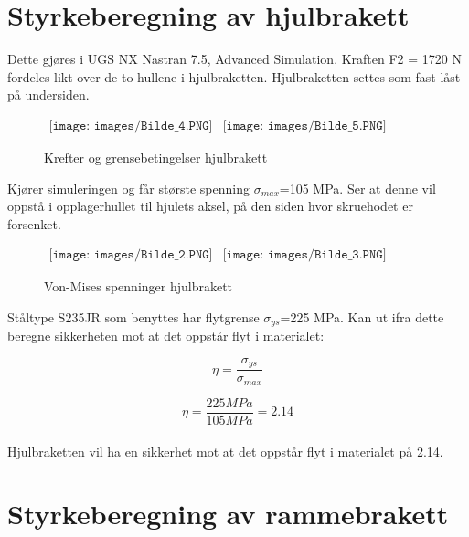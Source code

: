 \section{Styrkeberegning av hjulbrakett}
Dette gjøres i UGS NX Nastran 7.5, Advanced Simulation. Kraften F2 = 1720 N fordeles likt over de to hullene i hjulbraketten. Hjulbraketten settes som fast låst på undersiden.

\begin{figure}[h]
\begin{center}$
\begin{array}{ccc}
\texttt{[image: images/Bilde\_4.PNG]} &
\texttt{[image: images/Bilde\_5.PNG]} &  
\end{array}$
\end{center}
\caption{Krefter og grensebetingelser hjulbrakett}
\end{figure}

Kjører simuleringen og får største spenning $\sigma_{max}$=105 MPa. Ser at denne vil oppstå i opplagerhullet til hjulets aksel, på den siden hvor skruehodet er forsenket.

\begin{figure}[h]
\begin{center}$
\begin{array}{ccc}
\texttt{[image: images/Bilde\_2.PNG]} &
\texttt{[image: images/Bilde\_3.PNG]} &  
\end{array}$
\end{center}
\caption{Von-Mises spenninger hjulbrakett}
\end{figure}

Ståltype S235JR som benyttes har flytgrense $\sigma_{ys}$=225 MPa. Kan ut ifra dette beregne sikkerheten mot at det oppstår flyt i materialet:

\begin{equation}
\eta=\frac{\sigma_{ys}}{\sigma_{max}}
\end{equation}

\begin{equation}
\eta=\frac{225 MPa}{105 MPa}=2.14
\end{equation}\\

Hjulbraketten vil ha en sikkerhet mot at det oppstår flyt i materialet på 2.14.

\section{Styrkeberegning av rammebrakett}

